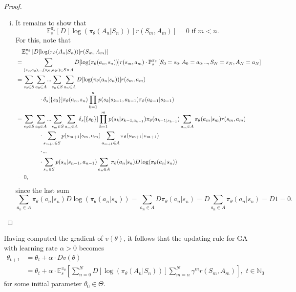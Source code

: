 \begin{proof}
\begin{enumerate}[(i)]
    \item It remains to show that
    \[
        \mathbb{E}_s^{\pi_\theta} \left[  D [\log(\pi_\theta(A_n | S_n))] r(S_m, A_m) \right] = 0 \text{ if } m < n.
    \]
    For this, note that
    \begin{align*}
        &\quad \mathbb{E}_s^{\pi_\theta} \left[  D [\log(\pi_\theta(A_n | S_n))] r(S_m, A_m) \right]\\
        &= \sum_{(s_{0},a_{0}),\kern-0.10em.\kern-0.06em.\kern-0.06em.\kern-0.1em,(s_N, a_N) \in S \times A} D [\log(\pi_\theta(a_n,s_n))] r(s_m, a_m) \cdot \mathbb{P}_s^{\pi_\theta} \left[ S_{0} = s_{0}, A_{0} = a_{0},\kern-0.10em.\kern-0.06em.\kern-0.06em.\kern-0.1em, S_N = s_N, A_N = a_N \right]\\
        &= \sum_{s_{0} \in S} \sum_{a_{0} \in A} \kern-0.10em.\kern-0.06em.\kern-0.06em.\kern-0.1em \sum_{s_n \in S} \sum_{ a_n \in A} D [\log(\pi_\theta(a_n | s_n))] r(s_m, a_m)\\
        & \qquad \qquad \cdot \delta_s[\left\{ s_{0} \right\}] \pi_\theta(a_{n},s_{n}) \prod_{k=1}^n p(s_k | s_{k-1}, a_{k-1}) \pi_\theta(a_{k-1} | s_{k-1})\\
        &= \sum_{s_{0} \in S} \sum_{a_{0} \in A} \kern-0.10em.\kern-0.06em.\kern-0.06em.\kern-0.1em \sum_{s_m \in S} \sum_{ a_m \in A} \delta_s[\left\{ s_{0} \right\}] \prod_{k=1}^m p(s_k | s_{k-1, a_{k-1}}) \pi_\theta(a_{k-1 | s_{k-1}}) \sum_{a_m \in A} \pi_\theta(a_m | s_m) r(s_m, a_m) \\
        & \qquad \qquad \cdot \sum_{s_{m+1} \in S} p(s_{m+1} | s_m, a_m) \sum_{a_{m+1} \in A} \pi_\theta(a_{m+1} | s_{m+1}) \\
        & \qquad \qquad \cdot \kern-0.10em.\kern-0.06em.\kern-0.06em.\kern-0.1em\\
        & \qquad \qquad \cdot \sum_{s_{n} \in S} p(s_{n} | s_{n-1}, a_{n-1}) \sum_{a_{n} \in A} \pi_\theta(a_{n} | s_{n}) D \log(\pi_\theta(a_n | s_n))\\
        &= 0,
    \end{align*}
    since the last sum 
    \[
       \sum_{a_{n} \in A} \pi_\theta(a_{n} | s_{n}) D \log(\pi_\theta(a_n | s_n)) = \sum_{a_n \in A} D \pi_\theta(a_n | s_n) = D \sum_{a_n \in A} \pi_\theta(a_n |s_n) = D 1 = 0.
    \]
\end{enumerate}    
\end{proof}



Having computed the gradient of \( v(\theta) \), it follows that the updating rule for GA with learning rate \( \alpha > 0 \) becomes
\begin{align*}
    \theta_{t+1} &= \theta_t + \alpha \cdot Dv(\theta) \\
            &= \theta_t + \alpha \cdot \mathbb{E}_s^{\pi_\theta} \left[  \sum_{ n=0}^N D[\log(\pi_\theta(A_n | S_n))] \sum_{m=n}^N \gamma^m r(S_m, A_m) \right], \,\, t \in \mathbb{N}_{0}
\end{align*}  
for some initial parameter \( \theta_{0} \in \Theta \).

